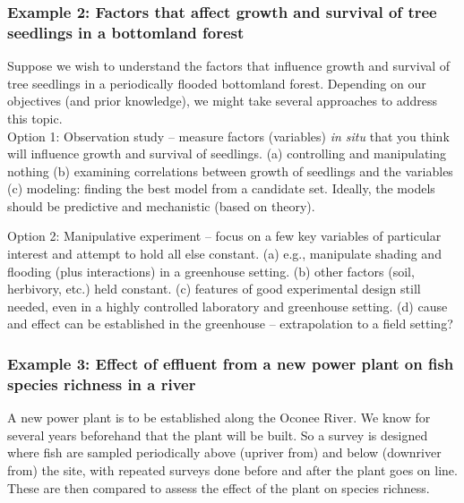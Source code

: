 \documentclass[color=usenames,dvipsnames]{beamer}\usepackage[]{graphicx}\usepackage[]{color}
\begin{document}
\begin{frame}
  \frametitle{Example 2: Factors that affect growth and survival of
    tree seedlings in a bottomland forest}
  Suppose we wish to understand the factors that influence growth and
  survival of tree seedlings in a periodically flooded bottomland
  forest.  Depending on our objectives (and prior knowledge), we might
  take several approaches to address this topic. \\

  Option 1: Observation study -- measure factors (variables) {\it in
    situ} that you think will influence growth and survival of seedlings. 
	(a) controlling and manipulating nothing
	(b) examining correlations between growth of seedlings and the variables
	(c) modeling: finding the best model from a candidate
        set. Ideally, the models should be predictive and mechanistic
        (based on theory).


  Option 2: Manipulative experiment -- focus on a few key variables of
  particular interest and attempt to hold all else constant. 
	(a) e.g., manipulate shading and flooding (plus interactions) in a greenhouse setting.
	(b) other factors (soil, herbivory, etc.) held constant.
	(c) features of good experimental design still needed, even in
        a highly controlled laboratory and greenhouse setting. 
	(d) cause and effect can be established in the greenhouse –
        extrapolation to a field setting?         
\end{frame}



\begin{frame}
  \frametitle{Example 3: Effect of effluent from a new power plant on
    fish species richness in a river}
  A new power plant is to be established along the Oconee River.  We
  know for several years beforehand that the plant will be built.  So
  a survey is designed where fish are sampled periodically above
  (upriver from) and below (downriver from) the site, with repeated
  surveys done before and after the plant goes on line.  These are
  then compared to assess the effect of the plant on species richness.   
\end{frame}
\end{document}
